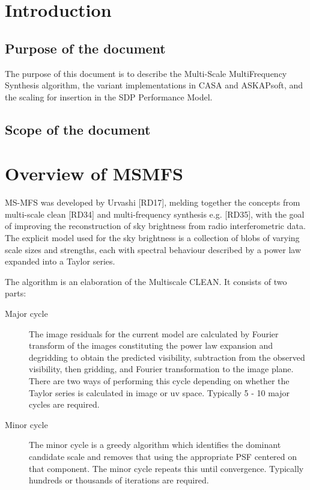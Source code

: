 \documentclass[11pt,a4paper]{article}
\begin{document}
\newpage
\section{Introduction}

\subsection{Purpose of the document}


The purpose of this document is to describe the Multi-Scale MultiFrequency Synthesis algorithm, the variant implementations in CASA and ASKAPsoft, and the scaling for insertion in the SDP Performance Model.

\subsection{Scope of the document}

\clearpage
\section{Overview of MSMFS}
\label{sec:overview}

MS-MFS was developed by Urvashi [RD17], melding together the concepts from multi-scale clean [RD34] and multi-frequency synthesis e.g. [RD35], with the goal of improving the reconstruction of sky brightness from radio interferometric data. The explicit model used for the sky brightness is a collection of blobs of varying scale sizes and strengths, each with spectral behaviour described by a power law expanded into a Taylor series.

The algorithm is an elaboration of the Multiscale CLEAN. It consists of two parts:
\begin{description}
\item[Major cycle] The image residuals for the current model are calculated by Fourier transform of the images constituting the power law expansion and degridding to obtain the predicted visibility, subtraction from the observed visibility, then gridding, and Fourier transformation to the image plane. There are two ways of performing this cycle depending on whether the Taylor series is calculated in image or uv space. Typically 5 - 10 major cycles are required.
\item[Minor cycle] The minor cycle is a greedy algorithm which identifies the dominant candidate scale and removes that using the appropriate PSF centered on that component. The minor cycle repeats this until convergence. Typically hundreds or thousands of iterations are required.
\end{description}
\end{document}
